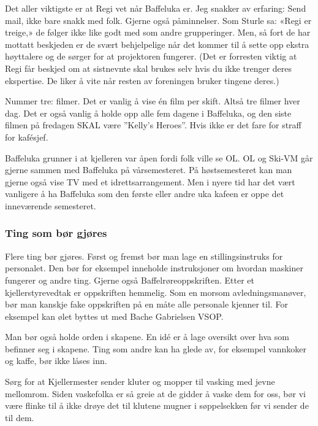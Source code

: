 Det aller viktigste er at Regi vet når Baffeluka er. Jeg snakker av erfaring:
Send mail, ikke bare snakk med folk.  Gjerne også påminnelser. Som Sturle sa:
«Regi er treige,» de følger ikke like godt med som andre grupperinger. Men, så
fort de har mottatt beskjeden er de svært behjelpelige når det kommer til å
sette opp ekstra høyttalere og de sørger for at projektoren fungerer. (Det er
forresten viktig at Regi får beskjed om at sistnevnte skal brukes selv hvis du
ikke trenger deres ekspertise. De liker å vite når resten av foreningen bruker
tingene deres.)

Nummer tre: filmer. Det er vanlig å vise én film per skift. Altså tre filmer
hver dag. Det er også vanlig å holde opp alle fem dagene i Baffeluka, og den
siste filmen på fredagen SKAL være ''Kelly's Heroes''. Hvis ikke er det fare for
straff for kafésjef.

Baffeluka grunner i at kjelleren var åpen fordi folk ville se OL. OL og Ski-VM
går gjerne sammen med Baffeluka på vårsemesteret. På høstsemesteret kan man
gjerne også vise TV med et idrettsarrangement. Men i nyere tid har det vært
vanligere å ha Baffeluka som den første eller andre uka kafeen er oppe det
inneværende semesteret.

\subsubsection{Ting som bør gjøres} Flere ting bør gjøres. Først og fremst bør
man lage en stillingsinstruks for personalet. Den bør for eksempel inneholde
instruksjoner om hvordan maskiner fungerer og andre ting. Gjerne også
Baffelrøreoppskriften. Etter et kjellerstyrevedtak er oppskriften hemmelig. Som
en morsom avledningsmanøver, bør man kanskje fake oppskriften på en måte alle
personale kjenner til.  For eksempel kan ølet byttes ut med Bache Gabrielsen
VSOP.

Man bør også holde orden i skapene. En id\'e er å lage oversikt over hva som
befinner seg i skapene. Ting som andre kan ha glede av, for eksempel vannkoker
og kaffe, bør ikke låses inn.

Sørg for at Kjellermester sender kluter og mopper til vasking med jevne
mellomrom. Siden vaskefolka er så greie at de gidder å vaske dem for oss, bør vi
være flinke til å ikke drøye det til klutene mugner i søppelsekken før vi sender
de til dem.
